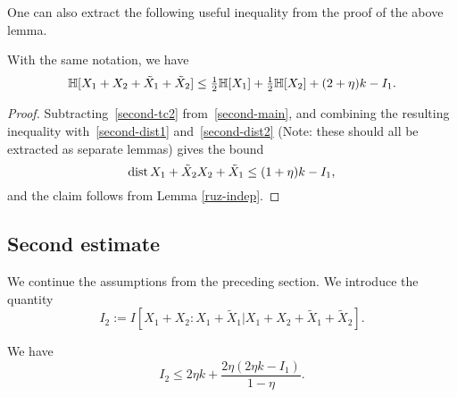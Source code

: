 One can also extract the following useful inequality from the proof of the above lemma.

\begin{lemma}\label{foursum-bound}
  \leanok
  With the same notation, we have
  \begin{equation}
    \label{HS-bound}
    \mathbb{H}[X_1+X_2+\tilde X_1+\tilde X_2] \le \tfrac{1}{2} \mathbb{H}[X_1]+\tfrac{1}{2} \mathbb{H}[X_2] + (2 + \eta) k - I_1.
  \end{equation}
\end{lemma}

\begin{proof}
  Subtracting~\eqref{second-tc2} from~\eqref{second-main}, and combining the resulting inequality with~\eqref{second-dist1} and~\eqref{second-dist2} (Note: these should all be extracted as separate lemmas) gives the bound
\[
  \operatorname{dist}{X_1+\tilde X_2}{X_2+\tilde X_1} \le (1 + \eta) k - I_1,
\]
and the claim follows from Lemma \ref{ruz-indep}.
\end{proof}


\subsection{Second estimate}

We continue the assumptions from the preceding section.
We introduce the quantity
$$ I_2 := I[ X_1+X_2 : X_1 + \tilde X_1 | X_1+X_2+\tilde X_1+\tilde X_2 ].$$

\begin{lemma}\label{second-estimate}
  \leanok
We have
$$ I_2 \leq 2 \eta k + \frac{2 \eta (2 \eta k - I_1)}{1 - \eta}.$$
\end{lemma}

